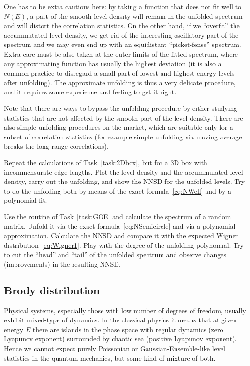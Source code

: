\documentclass[a4paper,11pt,twoside]{article}
\begin{document}
\begin{enumerate}
                One has to be extra cautious here: by taking a function that does not fit well to $N(E)$, a part of the smooth level density will remain in the unfolded spectrum and will distort the correlation statistics.
                On the other hand, if we ``overfit'' the accummutated level density, we get rid of the interesting oscillatory part of the spectrum and we may even end up with an equidistant ``picket-fense'' spectrum.
                Extra care must be also taken at the outer limits of the fitted spectrum, where any approximating function has usually the highest deviation (it is also a common practice to disregard a small part of lowest and highest energy levels after unfolding).
                The approximate unfolding is thus a very delicate procedure, and it requires some experience and feeling to get it right.  

                Note that there are ways to bypass the unfolding procedure by either studying statistics that are not affected by the smooth part of the level density.
                There are also simple unfolding procedures on the market, which are suitable only for a subset of correlation statistics (for example simple unfolding via moving average breaks the long-range correlations).
        \end{enumerate}

        \begin{task}
            Repeat the calculations of Task~\ref{task:2Dbox}, but for a 3D box with incommensurate edge lengths.
            Plot the level density and the accummulated level density, carry out the unfolding, and show the NNSD for the unfolded levels.
            Try to do the unfolding both by means of the exact formula~\eqref{eq:NWell} and by a polynomial fit.
        \end{task}

        \begin{task}\label{task:GOE}
            Use the routine of Task~\ref{task:GOE} and calculate the spectrum of a random matrix.
            Unfold it via the exact formula~\eqref{eq:NSemicircle} and via a polynomial approximation.
            Calculate the NNSD and compare it with the expected Wigner distribution~\eqref{eq:Wigner1}.
            Play with the degree of the unfolding polynomial.
            Try to cut the ``head'' and ``tail'' of the unfolded spectrum and observe changes (improvements) in the resulting NNSD. 
        \end{task}

    \subsection{Brody distribution}
        Physical systems, especially those with low number of degrees of freedom, usually exhibit mixed-type of dynamics.
        In the classical physics it means that at given energy $E$ there are islands in the phase space with regular dynamics (zero Lyapunov exponent) surrounded by chaotic sea (positive Lyapunov exponent).
        Hence we cannot expect purely Poissonian or Gaussian-Ensemble-like level statistics in the quantum mechanics, but some kind of mixture of both.
\end{document}

